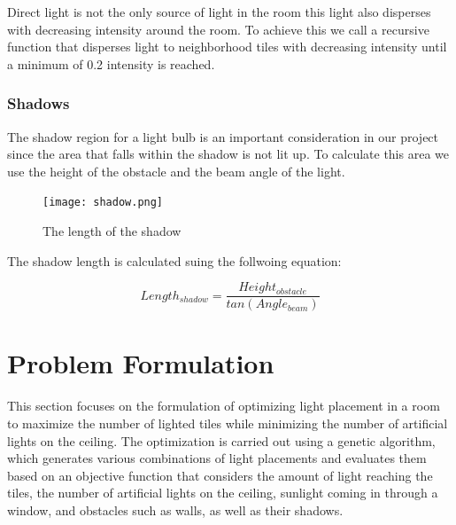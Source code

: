 \documentclass[conference]{IEEEtran}
\begin{document}
Direct light is not the only source of light in the room this light also disperses with decreasing intensity around the room. To achieve this we call a recursive function that disperses light to neighborhood tiles with decreasing intensity until a minimum of 0.2 intensity is reached.\\ 

\subsubsection{Shadows}

The shadow region for a light bulb is an important consideration in our project since the area that falls within the shadow is not lit up. To calculate this area we use the height of the obstacle and the beam angle of the light.
\begin{figure}
    \centering
    \texttt{[image: shadow.png]}
    \caption{The length of the shadow}
    \label{fig:fill_vessel}
\end{figure}

The shadow length is calculated suing the follwoing equation:

\begin{equation}
    Length_{shadow} = \frac{Height_{obstacle}}{tan(Angle_{beam})}
\end{equation}




\section{Problem Formulation}
This section focuses on the formulation of optimizing light placement in a room to maximize the number of lighted tiles while minimizing the number of artificial lights on the ceiling. The optimization is carried out using a genetic algorithm, which generates various combinations of light placements and evaluates them based on an objective function that considers the amount of light reaching the tiles, the number of artificial lights on the ceiling, sunlight coming in through a window, and obstacles such as walls, as well as their shadows.
\end{document}
